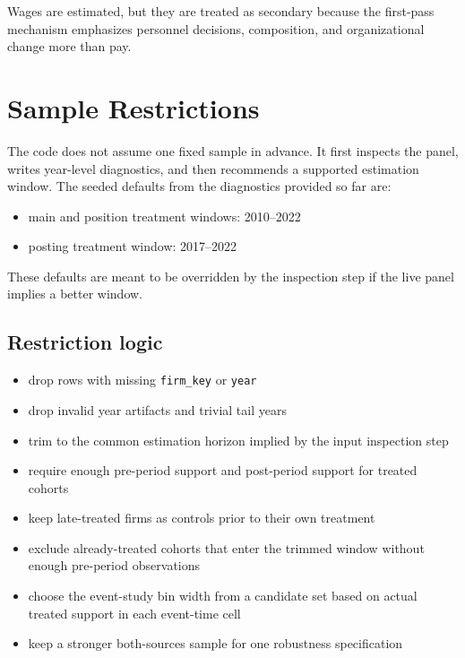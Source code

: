 \documentclass[11pt]{article}
\begin{document}
Wages are estimated, but they are treated as secondary because the first-pass mechanism emphasizes personnel decisions, composition, and organizational change more than pay.

\section{Sample Restrictions}

The code does not assume one fixed sample in advance. It first inspects the panel, writes year-level diagnostics, and then recommends a supported estimation window. The seeded defaults from the diagnostics provided so far are:

\begin{itemize}[leftmargin=1.5em]
    \item main and position treatment windows: 2010--2022
    \item posting treatment window: 2017--2022
\end{itemize}

These defaults are meant to be overridden by the inspection step if the live panel implies a better window.

\subsection*{Restriction logic}

\begin{itemize}[leftmargin=1.5em]
    \item drop rows with missing \texttt{firm\_key} or \texttt{year}
    \item drop invalid year artifacts and trivial tail years
    \item trim to the common estimation horizon implied by the input inspection step
    \item require enough pre-period support and post-period support for treated cohorts
    \item keep late-treated firms as controls prior to their own treatment
    \item exclude already-treated cohorts that enter the trimmed window without enough pre-period observations
    \item choose the event-study bin width from a candidate set based on actual treated support in each event-time cell
    \item keep a stronger both-sources sample for one robustness specification
\end{itemize}
\end{document}
